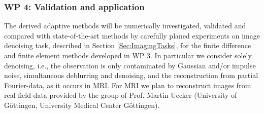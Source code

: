 \documentclass[enabledeprecatedfontcommands,cleardoublepage=empty,headsepline,twoside,11pt,DIV=15,BCOR=12mm,final]{scrartcl}
\begin{document}
 

 
%
% 



 
\subsubsection*{WP 4: Validation and application} 
 
The derived adaptive methods will be numerically investigated, validated and compared with state-of-the-art methods by carefully planed experiments on image denoising task, described in Section \ref{Sec:ImagingTasks}, for the finite difference and finite element methods developed in WP 3. In particular we consider solely denoising, i.e., the observation is only contaminated by Gaussian and/or impulse noise, simultaneous deblurring and denoising, and the reconstruction from partial Fourier-data, as it occurs in MRI. For MRI we plan to reconstruct images from real field-data provided by the group of Prof. Martin Uecker (University of G\"ottingen, University Medical Center G\"ottingen).

\end{document}
